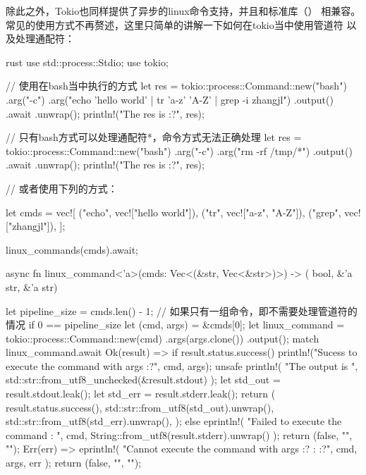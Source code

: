 除此之外，Tokio也同样提供了异步的linux命令支持，并且和标准库（）
相兼容。常见的使用方式不再赘述，这里只简单的讲解一下如何在tokio当中使用管道符
以及处理通配符：
\begin{code-block}{rust}
use std::process::Stdio;
use tokio;

// 使用在bash当中执行的方式
let res = tokio::process::Command::new("bash")
    .arg("-c")
    .arg("echo 'hello world' | tr 'a-z' 'A-Z' | grep -i zhangjl")
    .output()
    .await
    .unwrap();
println!("The res is {:?}", res);

// 只有bash方式可以处理通配符*，命令方式无法正确处理
let res = tokio::process::Command::new("bash")
    .arg("-c")
    .arg("rm -rf /tmp/*")
    .output()
    .await
    .unwrap();
println!("The res is {:?}", res);

// 或者使用下列的方式：

let cmds = vec![
    ("echo", vec!["hello world"]),
    ("tr", vec!["a-z", "A-Z"]),
    ("grep", vec!["zhangjl"]),
];

linux_commands(cmds).await;

async fn linux_command<'a>(cmds: Vec<(&str, Vec<&str>)>) -> (
    bool, &'a str, &'a str) {
    let pipeline_size = cmds.len() - 1;
    // 如果只有一组命令，即不需要处理管道符的情况
    if 0 == pipeline_size {
        let (cmd, args) = &cmds[0];
        let linux_command = tokio::process::Command::new(cmd)
            .args(args.clone())
            .output();
        match linux_command.await {
            Ok(result) => {
                if result.status.success() {
                    println!("Sucess to execute the command {} with args {:?}",
                        cmd, args);
                    unsafe {
                        println!(
                            "The output is {}",
                            std::str::from_utf8_unchecked(&result.stdout)
                        );
                    }
                    let std_out = result.stdout.leak();
                    let std_err = result.stderr.leak();
                    return (
                        result.status.success(),
                        std::str::from_utf8(std_out).unwrap(),
                        std::str::from_utf8(std_err).unwrap(),
                    );
                } else {
                    eprintln!(
                        "Failed to execute the command {}: {}",
                        cmd,
                        String::from_utf8(result.stderr).unwrap()
                    );
                    return (false, "", "");
                }
            }
            Err(err) => {
                eprintln!(
                    "Cannot execute the command {} with args {:?} : {:?}",
                    cmd, args, err
                );
                return (false, "", "");
            }
        }
    }

}
\end{code-block}

